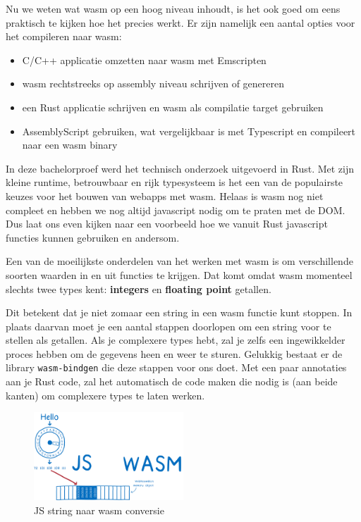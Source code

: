 Nu we weten wat wasm op een hoog niveau inhoudt, is het ook goed om eens praktisch te kijken hoe het
precies werkt. Er zijn namelijk een aantal opties voor het compileren naar wasm: 

\begin{itemize}
  \item C/C++ applicatie omzetten naar wasm met Emscripten 

  \item wasm rechtstreeks op assembly niveau schrijven of genereren 

  \item een Rust applicatie schrijven en wasm als compilatie target gebruiken 

  \item AssemblyScript gebruiken, wat vergelijkbaar is met Typescript en compileert naar een wasm
    binary 
\end{itemize}

In deze bachelorproef werd het technisch onderzoek uitgevoerd in Rust. Met zijn kleine runtime,
betrouwbaar en rijk typesysteem is het een van de populairste keuzes voor het bouwen van webapps met
wasm. Helaas is wasm nog niet compleet en hebben we nog altijd javascript nodig om te praten met de
DOM. Dus laat ons even kijken naar een voorbeeld hoe we vanuit Rust javascript functies kunnen
gebruiken en andersom.

Een van de moeilijkste onderdelen van het werken met wasm is om verschillende soorten waarden in en
uit functies te krijgen. Dat komt omdat wasm momenteel slechts twee types kent: \textbf{integers} en
\textbf{floating point} getallen. 

Dit betekent dat je niet zomaar een string in een wasm functie kunt stoppen. In plaats daarvan moet
je een aantal stappen doorlopen om een string voor te stellen als getallen. Als je complexere types
hebt, zal je zelfs een ingewikkelder proces hebben om de gegevens heen en weer te sturen. Gelukkig
bestaat er de library \texttt{wasm-bindgen} die deze stappen voor ons doet. Met een paar
annotaties aan je Rust code, zal het automatisch de code maken die nodig is (aan beide kanten) om
complexere types te laten werken.

\begin{figure}[h]
  \centering
  \includegraphics[width=0.5\textwidth]{figures/wasm_bindgen.png}
  \caption{JS string naar wasm conversie}
\end{figure}

